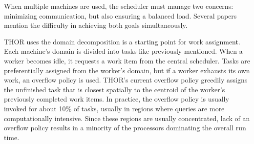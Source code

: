 \documentclass[twoside,leqno,twocolumn]{article}
\newcommand{\authornote}[1]{\footnote{Note to self: #1}}
\newcommand{\authorsnote}[1]{\authornote{#1}}
\begin{document}
When multiple machines are used, the scheduler must manage two concerns: minimizing communication, but also ensuring a balanced load.
Several papers \cite{markatos94using, banicescu, salmon, warren} mention the difficulty in achieving both goals simultaneously.

THOR uses the domain decomposition is a starting point for work assignment.
Each machine's domain is divided into tasks like previously mentioned.
When a worker becomes idle, it requests a work item from the central scheduler.
Tasks are preferentially assigned from the worker's domain, but if a worker exhausts its own work, an overflow policy is used.
THOR's current overflow policy greedily assigns the unfinished task that is closest spatially to the centroid of the worker's previously completed work items.
In practice, the overflow policy is usually invoked for about 10\% of tasks, usually in regions where queries are more computationally intensive.
Since these regions are usually concentrated, lack of an overflow policy results in a minority of the processors dominating the overall run time.




\end{document}
